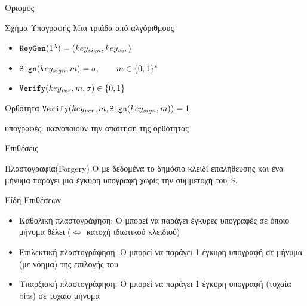 \documentclass[handout]{beamer}
\begin{document}
\begin{frame}{Ορισμός}
\begin{block}{Σχήμα Υπογραφής}
Μια τριάδα από αλγόριθμους
\begin{itemize}
\item $\mathtt{KeyGen}(1^\lambda) = (key_{sign},key_{ver})$
\pause
\item $\mathtt{Sign}(key_{sign}, m) = \sigma, \quad\quad m \in \{0,1\}^*$
\pause
\item $\mathtt{Verify}(key_{ver}, m, \sigma) \in \{0,1\}$
\end{itemize}
\end{block}
\pause
\begin{block}{Ορθότητα}
$\mathtt{Verify}(key_{ver}, m, \mathtt{Sign}(key_{sign}, m))=1$
\end{block}
\pause
{} υπογραφές: ικανοποιούν την απαίτηση της ορθότητας

\end{frame}

\begin{frame}{Επιθέσεις}
\begin{block}{Πλαστογραφία(Forgery)}
O \adv με δεδομένα το δημόσιο κλειδί επαλήθευσης και ένα μήνυμα παράγει μια έγκυρη υπογραφή χωρίς την συμμετοχή του $S$. 
\end{block}
\pause
\begin{block}{\alert{Είδη Επιθέσεων}}
\begin{itemize}
\item \alert{Καθολική πλαστογράφηση}: Ο \adv μπορεί να παράγει έγκυρες υπογραφές σε όποιο μήνυμα θέλει ($\Leftrightarrow$ κατοχή ιδιωτικού κλειδιού)
\pause
\item \alert{Επιλεκτική πλαστογράφηση}: Ο \adv μπορεί να παράγει 1 έγκυρη υπογραφή σε μήνυμα (με νόημα) της επιλογής του   
\pause
\item \alert{Υπαρξιακή πλαστογράφηση}: Ο \adv μπορεί να παράγει 1 έγκυρη υπογραφή (τυχαία bits) σε τυχαίο μήνυμα
\end{itemize}
\end{block}
\end{frame}
\end{document}
